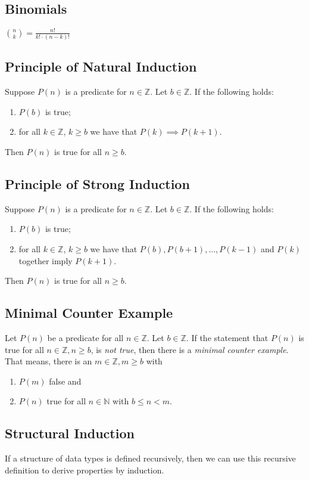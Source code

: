 \documentclass[fleqn]{article}
\begin{document}
\subsection{Binomials}
$\binom{n}{k} = \frac{n!}{k! \cdot (n - k)!}$

\subsection{Principle of Natural Induction}
Suppose $P(n)$ is a predicate for $n \in \mathbb{Z}$. Let $b \in \mathbb{Z}$.
If the following holds:
\begin{enumerate}
    \item $P(b)$ is true;
    \item for all $k \in \mathbb{Z}$, $k \geq b$ we have that $P(k) \implies P(k+1)$.
\end{enumerate}
Then $P(n)$ is true for all $n \geq b$.

\subsection{Principle of Strong Induction}
Suppose $P(n)$ is a predicate for $n \in \mathbb{Z}$. Let $b \in \mathbb{Z}$.
If the following holds:
\begin{enumerate}
    \item $P(b)$ is true;
    \item for all $k \in \mathbb{Z}$, $k \geq b$ we have that $P(b), P(b+1), \dots, P(k-1)$
        and $P(k)$ together imply $P(k+1)$.
\end{enumerate}
Then $P(n)$ is true for all $n \geq b$.

\subsection{Minimal Counter Example}
Let $P(n)$ be a predicate for all $n \in \mathbb{Z}$. Let $b \in \mathbb{Z}$. If
the statement that $P(n)$ is true for all $n \in \mathbb{Z}, n \geq b$, is \textit{not true},
then there is a \textit{minimal counter example}. That means, there is an $m \in \mathbb{Z}, m \geq b$ with
\begin{enumerate}
    \item $P(m)$ false and
    \item $P(n)$ true for all $n \in \mathbb{N}$ with $b \leq n < m$.
\end{enumerate}

\subsection{Structural Induction}
If a structure of data types is defined recursively, then we can use this recursive
definition to derive properties by induction.
\end{document}
